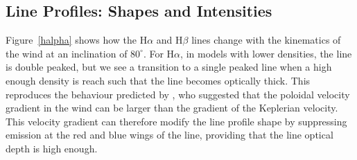 \documentclass[preprint, a4paper, 11pt]{aastex}
\begin{document}
\subsection{Line Profiles: Shapes and Intensities}






Figure~\ref{halpha} shows how the H$\alpha$ and H$\beta$ lines change with the kinematics 
of the wind at an inclination of $80^\circ$. For H$\alpha$, in models with lower densities, the
line is double peaked, but we see a transition to a single peaked line when 
a high enough density is reach such that the line becomes optically thick.
This reproduces the behaviour predicted by \cite{MC96}, who suggested that
the poloidal velocity gradient in the wind can be larger than the gradient of 
the Keplerian velocity. This velocity gradient can therefore modify the line profile shape
by suppressing emission at the red and blue wings of the line, 
providing that the line optical depth is high enough.
\end{document}
